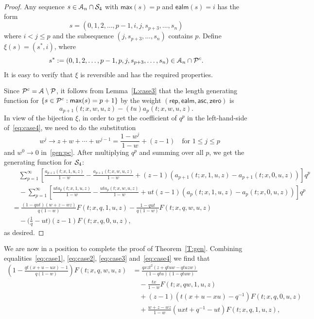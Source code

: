 \documentclass[12pt]{amsart}
\theoremstyle{plain}
\theoremstyle{definition}
\theoremstyle{example}
\theoremstyle{remark}
\numberwithin{equation}{section}
\numberwithin{figure}{section}
\newcommand{\asc}{\mathsf{asc}}
\def\max{\mathsf{max}}
\def\zero{\mathsf{zero}}
\def\rep{\mathsf{rep}}
\def\ealm{\mathsf{ealm}}
\def\A{\mathcal{A}}
\def\CS{ \CMcal{S}}
\begin{document}
\begin{proof}
Any sequence  $s\in \A_n\cap\CMcal{S}_4$ with $\max(s)=p$ and $\ealm(s)=i$ has the form
$$
s=(0,1,2,\ldots,p-1,i,j,s_{p+3},\ldots, s_{n})
$$
where $i<j\le p$ and the subsequence $(j,s_{p+3},\ldots,s_n)$ contains $p$.
Define  $\xi(s)=(s^*,i)$, where
$$s^*:=(0,1,2,\ldots,p-1,p,j,s_{p+3},\ldots, s_{n})\in \A_n\cap\CMcal{P}^c.
$$ It is easy to verify that $\xi$ is reversible and has the required properties.

Since $\CMcal{P}^c=\A\setminus\CMcal{P}$,  it follows from Lemma~\ref{L:case3} that  the length generating function  for $\{s\in\CMcal{P}^c: \max(s)=p+1\}$ by the weight $(\rep,\ealm,\asc,\zero)$ is
\begin{equation}\label{gen:pc}
a_{p+1}(t;x,w,u,z)-(tu)a_p(t;x,w,u,z).
\end{equation}
In view  of the bijection $\xi$, in order to get the coefficient of $q^p$ in the left-hand-side of~\eqref{eq:case4}, we need to do the substitution
$$
\quad w^j\rightarrow z+w+\cdots+w^{j-1}=\frac{1-w^j}{1-w}+(z-1)\quad \text{for  $1\le j\le p$}
$$
and $w^0\rightarrow 0$
in~\eqref{gen:pc}.
After multiplying $q^p$ and summing over all $p$,  we get the generating function for $\CS_4$:
\begin{align*}
&\quad \sum_{p=1}^{\infty}\left[\frac{a_{p+1}(t;x,1,u,z)}{1-w}-\frac{a_{p+1}(t;x,w,u,z)}{1-w}
+(z-1)(a_{p+1}(t;x,1,u,z)-a_{p+1}(t;x,0,u,z))\right]q^p\\
&\quad -\sum_{p=1}^{\infty}\left[\frac{uta_p(t;x,1,u,z)}{1-w}
-\frac{uta_p(t;x,w,u,z)}{1-w}+ut(z-1)(a_{p}(t;x,1,u,z)-a_{p}(t;x,0,u,z))\right]q^p\\
&=\frac{(1-qut)(w+z-wz)}{q(1-w)}F(t;x,q,1,u,z)-\frac{1-qut}{q(1-w)}F(t;x,q,w,u,z)\\
&\quad -\biggl(\frac{1}{q}-ut\biggr)(z-1)F(t;x,q,0,u,z),
\end{align*}
as desired.
\end{proof}
We are now in a position to complete the proof of Theorem~\ref{T:gen}. Combining equalities~\eqref{eq:case1}, \eqref{eq:case2}, \eqref{eq:case3} and~\eqref{eq:case4} we find that
\begin{align*}
\left(1-\frac{qt(x+u-ux)-1}{q(1-w)}\right)F(t;x,q,w,u,z)
&=\frac{qxzt^2(z+qtuw-qtuzw)}{(1-qtu)(1-qtuw)}\\
&\quad-\frac{tx}{1-w}F(t;x,qw,1,u,z)\\
&\quad+(z-1)(t(x+u-xu)-q^{-1})F(t;x,q,0,u,z)\\
&\quad+\frac{w+z-wz}{1-w}(uxt+q^{-1}-ut)F(t;x,q,1,u,z),
\end{align*}
\end{document}
